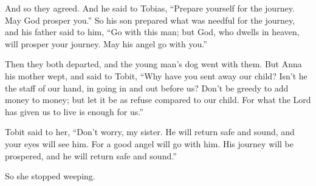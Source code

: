 {\par }{\PP {}And so they agreed. And he said to Tobias, “Prepare yourself for the journey. May God prosper you.” So his son prepared what was needful for the journey, and his father said to him, “Go with this man; but God, who dwells in heaven, will prosper your journey. May his angel go with you.”
\par }{\PP Then they both departed, and the young man’s dog went with them.
But Anna his mother wept, and said to Tobit, “Why have you sent away our child? Isn’t he the staff of our hand, in going in and out before us?
Don’t be greedy to add money to money; but let it be as refuse compared to our child.
For what the Lord has given us to live is enough for us.”
\par }{\PP {}Tobit said to her, “Don’t worry, my sister. He will return safe and sound, and your eyes will see him.
For a good angel will go with him. His journey will be prospered, and he will return safe and sound.”
\par }{\PP {}So she stopped weeping.

}
